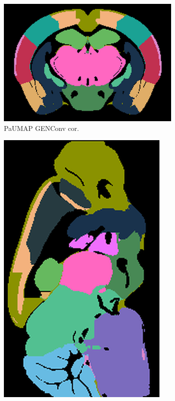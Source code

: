 \documentclass[]{article}
\begin{document}
\begin{figure}
	\hspace{1.5cm}
	\begin{subfigure}{.4\textwidth}
		\centering
		\includegraphics[width=.9\linewidth]{../results/para_umap_GEN_ano_coronal_50_res_clus_slice_1.png}
		\caption{PaUMAP GENConv cor.}
		\label{fig:disc_clustering_cor}
	\end{subfigure}
	\begin{subfigure}{.28\textwidth}
		\centering
		\includegraphics[width=.9\linewidth, angle=270]{../results/para_umap_GEN_ano_sagittal_50_res_clus_slice_1.png}

\end{subfigure}
\end{figure}
\end{document}
